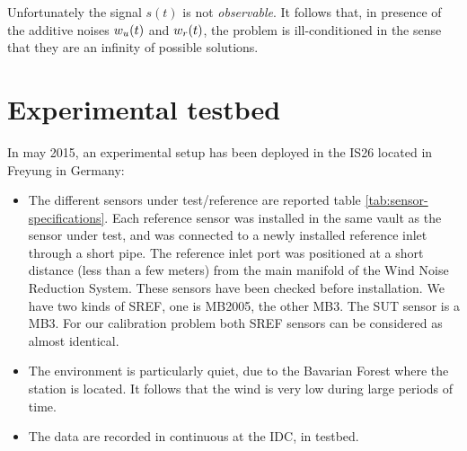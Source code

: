 Unfortunately the signal $s(t)$ is not  \emph{observable}. It follows that, in presence of the additive noises $w_{{u}}(t)$ and $w_{{r}}(t)$, the problem is ill-conditioned in the sense that they are an infinity of possible solutions.







 \newpage\clearpage
\section{Experimental testbed}
In may 2015, an experimental setup has been deployed in the IS26 located in Freyung in Germany:
\begin{itemize}
\item
The different sensors under test/reference are reported table \ref{tab:sensor-specifications}. Each reference sensor was installed in the same vault as the sensor under test, and was connected to a newly installed reference inlet through a short pipe. The reference inlet port was positioned at a short distance (less than a few meters) from the main manifold of the Wind Noise Reduction System. 
These sensors have been checked before installation. We have two kinds of SREF, one is MB2005, the other MB3. The SUT sensor is a MB3. For our calibration problem both SREF sensors can be considered as almost identical.
\item
The environment is particularly  quiet, due to the Bavarian Forest where the station is located. It follows that the wind is very low during large periods of time.

 \item
The data are recorded in continuous at the IDC, in testbed.
\end{itemize}

